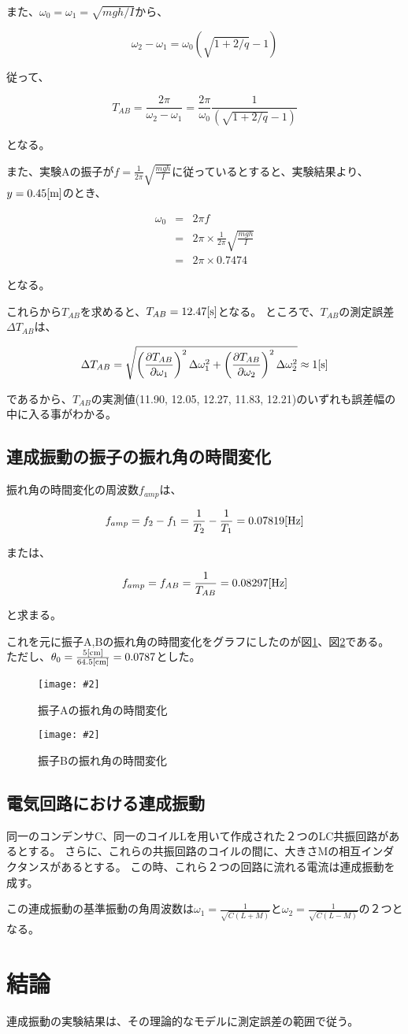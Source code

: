 \documentclass[uplatex,11pt]{jsarticle}
\newcommand{\cir}[3]{ %
    \begin{figure}
        \begin{center}
            \texttt{[image: \#2]}
            \caption{#3}
            \label{fg_#1}
         \end{center}
    \end{figure}
}
\newcommand{\fr}[1]{図\ref{fg_#1}}
\begin{document}
また、$\omega_0 = \omega_1 = \sqrt{mgh/I}$から、

\[
    \omega_2 - \omega_1 = \omega_0 \left( \sqrt{1 + 2/q} - 1 \right)
\]

従って、

\[
    T_{AB} = \frac{2\pi}{\omega_2 - \omega_1} = \frac{2\pi}{\omega_0}\frac{1}{\left(\sqrt{1+2/q} - 1\right)}
\]

となる。

また、実験Aの振子が$f = \frac{1}{2\pi}\sqrt{\frac{mgh}{I}}$に従っているとすると、実験結果より、$y=0.45[{\rm m}]$のとき、

\begin{eqnarray*}
    \omega_0 & = & 2\pi f \\
             & = & 2\pi \times \frac{1}{2\pi}\sqrt{\frac{mgh}{I}} \\
             & = & 2\pi \times 0.7474
\end{eqnarray*}

となる。

これらから$T_{AB}$を求めると、$T_{AB} = 12.47[{\rm s}]$となる。
ところで、$T_{AB}$の測定誤差$\Delta T_{AB}$は、

\[
    \Delta T_{AB} = \sqrt{\left( \frac{\partial T_{AB}}{\partial \omega_1} \right)^2 \Delta \omega_1^2 + \left( \frac{\partial T_{AB}}{\partial \omega_2}  \right)^2 \Delta \omega_2^2} \approx 1[{\rm s}]
\]

であるから、$T_{AB}$の実測値(11.90, 12.05, 12.27, 11.83, 12.21)のいずれも誤差幅の中に入る事がわかる。

\subsection{連成振動の振子の振れ角の時間変化}

振れ角の時間変化の周波数$f_{amp}$は、

$$
    f_{amp} = f_2 - f_1 = \frac{1}{T_2} - \frac{1}{T_1} = 0.07819[{\rm Hz}]
$$

または、

$$
    f_{amp} = f_{AB} = \frac{1}{T_{AB}} = 0.08297[{\rm Hz}]
$$

と求まる。

これを元に振子A,Bの振れ角の時間変化をグラフにしたのが\fr{f_theta_A}、\fr{f_theta_B}である。
ただし、$\theta_0 = \frac{5[{\rm cm}]}{64.5[{\rm cm}]} = 0.0787$とした。

\cir{f_theta_A}{graph/t_to_theta_A.png}{振子Aの振れ角の時間変化}
\cir{f_theta_B}{graph/t_to_theta_B.png}{振子Bの振れ角の時間変化}

\subsection{電気回路における連成振動}

同一のコンデンサC、同一のコイルLを用いて作成された２つのLC共振回路があるとする。
さらに、これらの共振回路のコイルの間に、大きさMの相互インダクタンスがあるとする。
この時、これら２つの回路に流れる電流は連成振動を成す。

この連成振動の基準振動の角周波数は$\omega_1 = \frac{1}{\sqrt{C(L+M)}}$と$\omega_2 = \frac{1}{\sqrt{C(L-M)}}$の２つとなる。

\section{結論}

連成振動の実験結果は、その理論的なモデルに測定誤差の範囲で従う。
\end{document}

